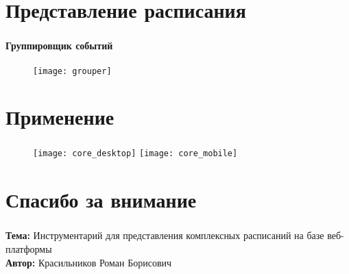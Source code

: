 
\section{Представление расписания}

\begin{frame}
\frametitle{\insertsection}
\framesubtitle{Группировщик событий}

\vspace{1cm}

\begin{figure}
    \center
    \texttt{[image: grouper]}
\end{figure}
\end{frame}


\section{Применение}

\begin{frame}
\frametitle{\insertsection}

\begin{figure}[!htb]
        \texttt{[image: core\_desktop]}
    \endminipage\hfill
        \texttt{[image: core\_mobile]}
    \endminipage
\end{figure}
\end{frame}


\section{Спасибо за внимание}

\begin{frame}
    \frametitle{\insertsection}
    \textbf{Тема:} Инструментарий для представления комплексных расписаний на базе веб-платформы \\
    \textbf{Автор:} Красильников Роман Борисович
\end{frame}

